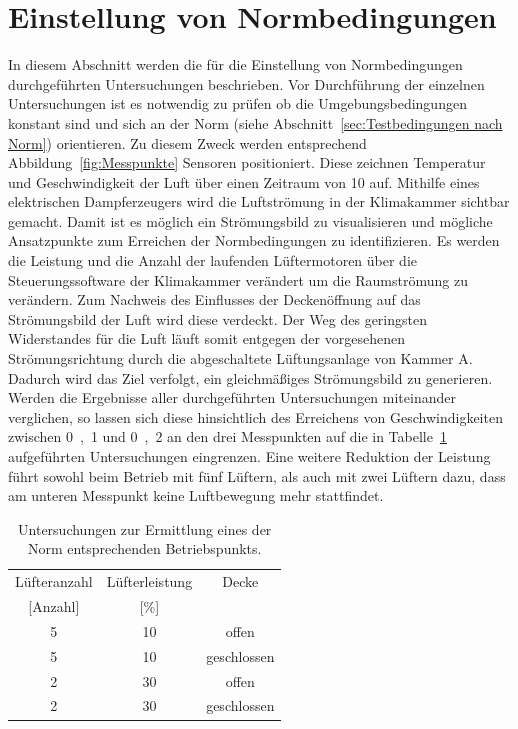 


\section{Einstellung von Normbedingungen}
\label{sec:EinstellungvonNormbedingungen}

In diesem Abschnitt werden die für die Einstellung von Normbedingungen durchgeführten Untersuchungen beschrieben.
Vor Durchführung der einzelnen Untersuchungen ist es notwendig zu prüfen ob die Umgebungsbedingungen konstant sind und sich an der Norm (siehe Abschnitt~\ref{sec:Testbedingungen nach Norm}) orientieren. Zu diesem Zweck werden entsprechend Abbildung~\ref{fig:Messpunkte} Sensoren positioniert. Diese zeichnen Temperatur und Geschwindigkeit der Luft über einen Zeitraum von \unit{10}{\min} auf. Mithilfe eines elektrischen Dampferzeugers wird die Luftströmung in der Klimakammer sichtbar gemacht. Damit ist es möglich ein Strömungsbild zu visualisieren und mögliche Ansatzpunkte zum Erreichen der Normbedingungen zu identifizieren. Es werden die Leistung und die Anzahl der laufenden Lüftermotoren über die Steuerungssoftware der Klimakammer verändert um die Raumströmung zu verändern. Zum Nachweis des Einflusses der Deckenöffnung auf das Strömungsbild der Luft wird diese verdeckt. Der Weg des geringsten Widerstandes für die Luft läuft somit entgegen der vorgesehenen Strömungsrichtung durch die abgeschaltete Lüftungsanlage von Kammer A. Dadurch wird das Ziel verfolgt, ein gleichmäßiges Strömungsbild zu generieren.  \newline
Werden die Ergebnisse aller durchgeführten Untersuchungen miteinander verglichen, so lassen sich diese hinsichtlich des Erreichens von Geschwindigkeiten zwischen \unit{0,1}{\meter\per\second} und \unit{0,2}{\meter\per\second} an den drei Messpunkten auf die in Tabelle~\ref{tab:Lüfterleistungen} aufgeführten Untersuchungen eingrenzen. Eine weitere Reduktion der Leistung führt sowohl beim Betrieb mit fünf Lüftern, als auch mit zwei Lüftern dazu, dass am unteren Messpunkt keine Luftbewegung mehr stattfindet. 

\begin{table}[h!]
\centering
\caption{Untersuchungen zur Ermittlung eines der Norm entsprechenden Betriebspunkts.}
\label{tab:Lüfterleistungen}
\begin{tabular}{|ccc|}
\hline
Lüfteranzahl            & Lüfterleistung          & Decke       \\
{[}Anzahl{]}            & {[}\%{]}                &             \\ \hline
\multicolumn{1}{|c|}{5} & \multicolumn{1}{c|}{10} & offen       \\
\multicolumn{1}{|c|}{5} & \multicolumn{1}{c|}{10} & geschlossen \\
\multicolumn{1}{|c|}{2} & \multicolumn{1}{c|}{30} & offen       \\
\multicolumn{1}{|c|}{2} & \multicolumn{1}{c|}{30} & geschlossen \\ \hline
\end{tabular}
\end{table}


